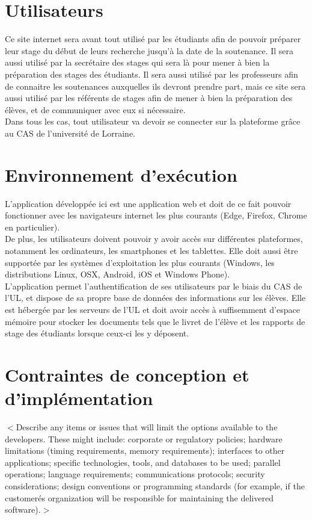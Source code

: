 \documentclass{scrreprt}
\begin{document}
\section{Utilisateurs}
\hspace{1cm}Ce site internet sera avant tout utilisé par les étudiants afin de pouvoir préparer leur stage du début de leurs recherche jusqu'à la date de la soutenance. Il sera aussi utilisé par la secrétaire des stages qui sera là pour mener à bien la préparation des stages des étudiants. Il sera aussi utilisé par les professeurs afin de connaitre les soutenances auxquelles ils devront prendre part, mais ce site sera aussi utilisé par les référents de stages afin de mener à bien la préparation des élèves, et de communiquer avec eux si nécessaire.\\

\hspace{0.6cm}Dans tous les cas, tout utilisateur va devoir se connecter sur la plateforme grâce au CAS de l'université de Lorraine.

\section{Environnement d'exécution}
\hspace{1cm}L'application développée ici est une application web et doit de ce fait pouvoir fonctionner avec les navigateurs internet les plus courants (Edge, Firefox, Chrome en particulier).\\

\hspace{0.6cm}De plus, les utilisateurs doivent pouvoir y avoir accès sur différentes plateformes, notamment les ordinateurs, les smartphones et les tablettes. Elle doit aussi être supportée par les systèmes d'exploitation les plus courants (Windows, les distributions Linux, OSX, Android, iOS et Windows Phone).\\

\hspace{0.6cm}L'application permet l'authentification de ses utilisateurs par le biais du CAS de l'UL, et dispose de sa propre base de données des informations sur les élèves. Elle est hébergée par les serveurs de l'UL et doit avoir accès à suffisemment d'espace mémoire pour stocker les documents tels que le livret de l'élève et les rapports de stage des étudiants lorsque ceux-ci les y déposent.


\section{Contraintes de conception et d'implémentation}
$<$Describe any items or issues that will limit the options available to the 
developers. These might include: corporate or regulatory policies; hardware 
limitations (timing requirements, memory requirements); interfaces to other 
applications; specific technologies, tools, and databases to be used; parallel 
operations; language requirements; communications protocols; security 
considerations; design conventions or programming standards (for example, if the 
customerés organization will be responsible for maintaining the delivered 
software).$>$
\end{document}
